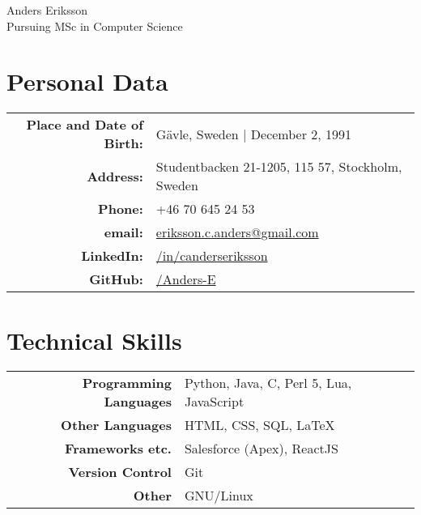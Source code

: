 \documentclass[a4paper,10pt]{article}
\begin{document}
\pagestyle{empty} %


\par{
    \centering
	{
	    \Huge \bitter Anders Eriksson \\
	    \normalfont
	    \normalsize Pursuing MSc in Computer Science
	}
	\bigskip\par
}

\section{Personal Data}

\begin{tabular}{rl}
    \textbf{Place and Date of Birth:} & Gävle, Sweden  | December 2, 1991 \\
    \textbf{Address:}   & Studentbacken 21-1205, 115 57, Stockholm, Sweden \\
    \textbf{Phone:}     & +46 70 645 24 53\\
    \textbf{email:}     & \href{mailto:eriksson.c.anders@gmail.com
}{eriksson.c.anders@gmail.com}\\
    \textbf{LinkedIn:}	& \href{http://se.linkedin.com/in/canderseriksson}{/in/canderseriksson}\\
    \textbf{GitHub:}	& \href{http://github.com/Anders-E}{/Anders-E}
\end{tabular}

\section{Technical Skills}
\begin{tabular}{r|l}
\textbf{Programming Languages} & Python, Java, C, Perl 5, Lua, JavaScript \\
\textbf{Other Languages} & HTML, CSS, SQL, \LaTeX \\
\textbf{Frameworks etc.} & Salesforce (Apex), ReactJS \\
\textbf{Version Control} & Git \\
\textbf{Other} & GNU/Linux\\
\end{tabular}
\end{document}
